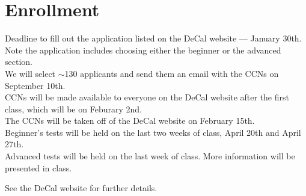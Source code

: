 \documentclass[11pt]{article}
\begin{document}
\section*{Enrollment}
Deadline to fill out the application listed on the DeCal website — January 30th.\\
Note the application includes choosing either the beginner or the advanced section.\\
We will select $\sim$130 applicants and send them an email with the CCNs on September 10th.\\
CCNs will be made available to everyone on the DeCal website after the first class, which will be on Feburary 2nd.\\
The CCNs will be taken off of the DeCal website on February 15th.\\
Beginner’s tests will be held on the last two weeks of class, April 20th and April 27th.\\
Advanced tests will be held on the last week of class. More information will be presented in class.

See the DeCal website for further details.
\end{document}
